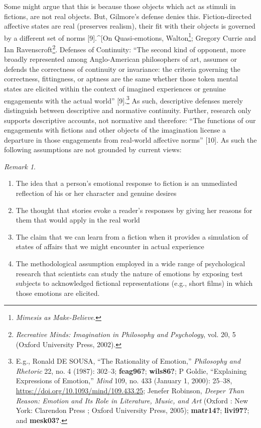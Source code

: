 \documentclass[
  12pt,
]{book}
\providecommand{\tightlist}{%
  \setlength{\itemsep}{0pt}\setlength{\parskip}{0pt}}
\providecommand{\tightlist}{%
  \setlength{\itemsep}{0pt}\setlength{\parskip}{0pt}}
\theoremstyle{definition}
\theoremstyle{definition}
\theoremstyle{definition}
\theoremstyle{definition}
\theoremstyle{remark}
\newtheorem*{remark}{Remark}
\begin{document}
Some might argue that this is because those objects which act as stimuli in fictions, are not real objects. But, Gilmore's defense denies this. Fiction-directed affective states are real (preserves realism), their fit with their objects is governed by a different set of norms {[}9{]}.\^{}{[}On Quasi-emotions, Walton\footnote{\emph{Mimesis as {Make-Believe}}.}; Gregory Currie and Ian Ravenscroft\footnote{\emph{Recreative Minds: Imagination in Philosophy and Psychology}, vol. 20, 5 (Oxford University Press, 2002).}. Defenses of Continuity: ``The second kind of opponent, more broadly represented among Anglo-American philosophers of art, assumes or defends the correctness of continuity or invariance: the criteria governing the correctness, fittingness, or aptness are the same whether those token mental states are elicited within the context of imagined experiences or genuine engagements with the actual world'' {[}9{]}.\footnote{E.g., Ronald DE SOUSA, {``The {Rationality} of {Emotion},''} \emph{Philosophy and Rhetoric} 22, no. 4 (1987): 302--3; \textbf{feag96?}; \textbf{wils86?}; P Goldie, {``Explaining Expressions of Emotion,''} \emph{Mind} 109, no. 433 (January 1, 2000): 25--38, \url{https://doi.org/10.1093/mind/109.433.25}; Jenefer Robinson, \emph{Deeper Than Reason: Emotion and Its Role in Literature, Music, and Art} (Oxford : New York: Clarendon Press ; Oxford University Press, 2005); \textbf{matr14?}; \textbf{livi97?}; and \textbf{mesk03?}.} As such, descriptive defenses merely distinguish between descriptive and normative continuity. Further, research only supports descriptive accounts, not normative and therefore: ``The functions of our engagements with fictions and other objects of the imagination license a departure in those engagements from real-world affective norms'' {[}10{]}. As such the following assumptions are not grounded by current views:

\begin{remark}
\leavevmode

\begin{enumerate}
\def\labelenumi{\arabic{enumi}.}
\tightlist
\item
  The idea that a person's emotional response to fiction is an unmediated reflection of his or her character and genuine desires
\item
  The thought that stories evoke a reader's responses by giving her reasons for them that would apply in the real world
\item
  The claim that we can learn from a fiction when it provides a simulation of states of affairs that we might encounter in actual experience
\item
  The methodological assumption employed in a wide range of psychological research that scientists can study the nature of emotions by exposing test subjects to acknowledged fictional representations (e.g., short films) in which those emotions are elicited.
\end{enumerate}

\end{remark}
\end{document}
